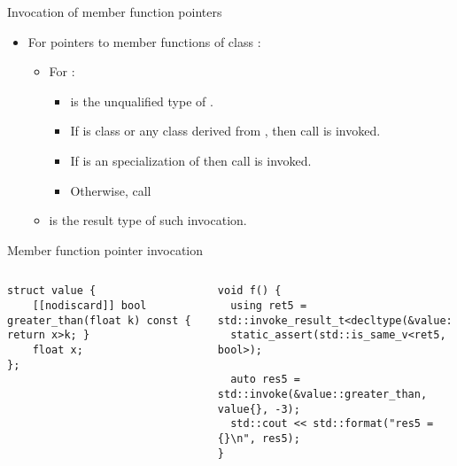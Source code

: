 \begin{frame}[t,fragile]{Invocation of member function pointers}
\begin{itemize}
  \item For pointers to member functions of class :
    \begin{itemize}
      \item For :
        \begin{itemize}
          \item {} is the unqualified type of .
          \item If  is class  or any class derived from ,
                then call  is invoked.
          \item If  is an specialization of 
                then call  is invoked.
          \item Otherwise,
                call 
        \end{itemize}
       \item {} 
             is the result type of such invocation.
    \end{itemize}
\end{itemize}
\begin{block}{Member function pointer invocation}
\begin{columns}[T]

\begin{lstlisting}[basicstyle=\mode<presentation>{\tiny}]
struct value {
    [[nodiscard]] bool greater_than(float k) const { return x>k; }
    float x;
};
\end{lstlisting}

\begin{lstlisting}[basicstyle=\mode<presentation>{\tiny}]
void f() {
  using ret5 = std::invoke_result_t<decltype(&value::greater_than),value,double>;
  static_assert(std::is_same_v<ret5, bool>);

  auto res5 = std::invoke(&value::greater_than, value{}, -3);
  std::cout << std::format("res5 = {}\n", res5);
}
\end{lstlisting}
\end{columns}
\end{block}
\end{frame}


